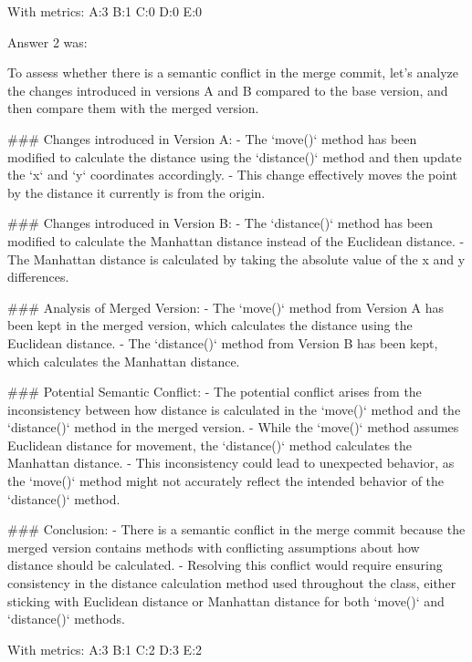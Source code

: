 With metrics:
A:3
B:1
C:0
D:0
E:0



Answer 2 was:
\begin{spverbatim}
To assess whether there is a semantic conflict in the merge commit, let's analyze the changes introduced in versions A and B compared to the base version, and then compare them with the merged version.

### Changes introduced in Version A:
- The `move()` method has been modified to calculate the distance using the `distance()` method and then update the `x` and `y` coordinates accordingly.
- This change effectively moves the point by the distance it currently is from the origin.

### Changes introduced in Version B:
- The `distance()` method has been modified to calculate the Manhattan distance instead of the Euclidean distance.
- The Manhattan distance is calculated by taking the absolute value of the x and y differences.

### Analysis of Merged Version:
- The `move()` method from Version A has been kept in the merged version, which calculates the distance using the Euclidean distance.
- The `distance()` method from Version B has been kept, which calculates the Manhattan distance.

### Potential Semantic Conflict:
- The potential conflict arises from the inconsistency between how distance is calculated in the `move()` method and the `distance()` method in the merged version.
- While the `move()` method assumes Euclidean distance for movement, the `distance()` method calculates the Manhattan distance.
- This inconsistency could lead to unexpected behavior, as the `move()` method might not accurately reflect the intended behavior of the `distance()` method.

### Conclusion:
- There is a semantic conflict in the merge commit because the merged version contains methods with conflicting assumptions about how distance should be calculated.
- Resolving this conflict would require ensuring consistency in the distance calculation method used throughout the class, either sticking with Euclidean distance or Manhattan distance for both `move()` and `distance()` methods.
\end{spverbatim}

With metrics:
A:3
B:1
C:2
D:3
E:2

